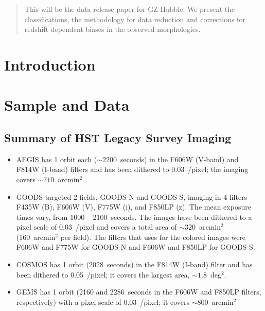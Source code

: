 \documentclass[usenatbib]{mn2e}
\begin{document}
\begin{abstract}

This will be the data release paper for GZ Hubble. We present the classifications, the methodology for data reduction and corrections for redshift dependent biases in the observed morphologies. 

\end{abstract}


\section{Introduction}


\section{Sample and Data} 

\subsection{Summary of HST Legacy Survey Imaging}

\begin{itemize}
\item AEGIS has 1 orbit each ($\sim2200$~seconds) in the F606W (V-band) and F814W (I-band) filters and has been dithered to 0.03~\arcsec/pixel; the imaging covers $\sim710$~arcmin$^2$.

\item GOODS targeted 2 fields, GOODS-N and GOODS-S, imaging in 4 filters -- F435W (B), F606W (V), F775W (i), and F850LP (z). The mean exposure times vary, from 1000 -- 2100~seconds. The images have been dithered to a pixel scale of 0.03~\arcsec/pixel and covers a total area of $\sim320$~arcmin$^2$ (160~arcmin$^2$ per field). The filters that \citet{gri12} uses for the colored images were F606W and F775W for GOODS-N and F606W and F850LP for GOODS-S.

\item COSMOS has 1 orbit (2028~seconds) in the F814W (I-band) filter and has been dithered to 0.05~\arcsec/pixel; it covers the largest area, $\sim1.8$~deg$^2$. 

\item GEMS has 1 orbit (2160 and 2286~seconds in the F606W and F850LP filters, respectively) with a pixel scale of 0.03~\arcsec/pixel; it covers $\sim800$~arcmin$^2$
\end{itemize}
\end{document}
